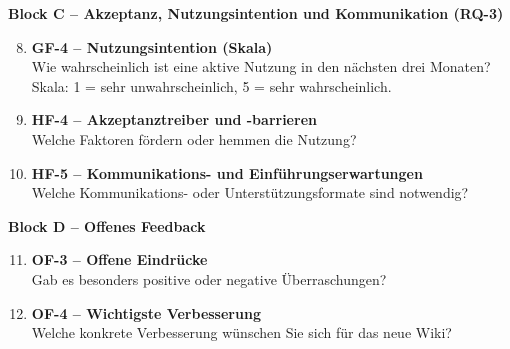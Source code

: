\textbf{Block C -- Akzeptanz, Nutzungsintention und Kommunikation (RQ-3)}

\begin{enumerate}
  \setcounter{enumi}{7}
  \item \textbf{GF-4 -- Nutzungsintention (Skala)}\\
        Wie wahrscheinlich ist eine aktive Nutzung in den nächsten drei Monaten?
        Skala: 1 = sehr unwahrscheinlich, 5 = sehr wahrscheinlich.

  \item \textbf{HF-4 -- Akzeptanztreiber und -barrieren}\\
        Welche Faktoren fördern oder hemmen die Nutzung?

  \item \textbf{HF-5 -- Kommunikations- und Einführungserwartungen}\\
        Welche Kommunikations- oder Unterstützungsformate sind notwendig?
\end{enumerate}

\textbf{Block D -- Offenes Feedback}

\begin{enumerate}
  \setcounter{enumi}{10}
  \item \textbf{OF-3 -- Offene Eindrücke}\\
        Gab es besonders positive oder negative Überraschungen?

  \item \textbf{OF-4 -- Wichtigste Verbesserung}\\
        Welche konkrete Verbesserung wünschen Sie sich für das neue Wiki?
\end{enumerate}

